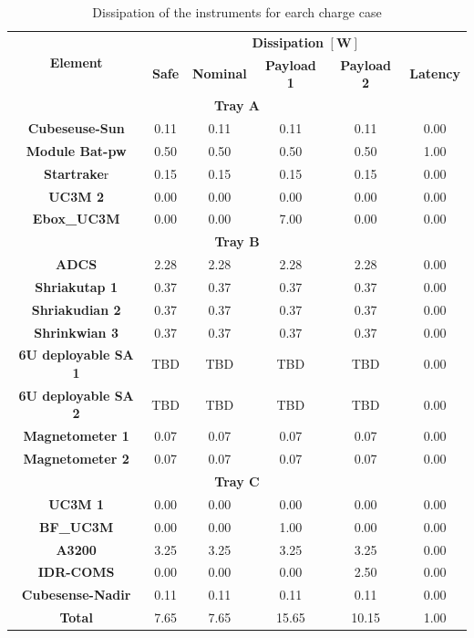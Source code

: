 \begin{table}[H]
    \centering
    \caption{Dissipation of the instruments for earch charge case}
    \label{tab:dissipationUPMSat3}
    
\begin{tabular}{cccccc}
    \toprule \multirow{2}{*}{ \textbf{Element }} & \multicolumn{5}{c}{ \textbf{Dissipation} $[\mathbf{W}]$} \\
    \cline{2-6} & \textbf{Safe} & \textbf{Nominal} & \textbf{Payload 1} & \textbf{Payload 2} &\textbf{ Latency} \\
    \hline \multicolumn{6}{c}{ \textbf{Tray A }} \\
    \hline \textbf{Cubeseuse-Sun} & 0.11 & 0.11 & 0.11 & 0.11 & 0.00 \\
     \textbf{Module Bat-pw} & 0.50 & 0.50 & 0.50 & 0.50 & 1.00 \\
     \textbf{Startrake}r & 0.15 & 0.15 & 0.15 & 0.15 & 0.00 \\
     \textbf{UC3M 2} & 0.00 & 0.00 & 0.00 & 0.00 & 0.00 \\
     \textbf{Ebox\_UC3M} & 0.00 & 0.00 & 7.00 & 0.00 & 0.00 \\
    \hline \multicolumn{6}{c}{ \textbf{Tray B }} \\
    \hline \textbf{ADCS} & 2.28 & 2.28 & 2.28 & 2.28 & 0.00 \\
     \textbf{Shriakutap 1} & 0.37 & 0.37 & 0.37 & 0.37 & 0.00 \\
     \textbf{Shriakudian 2} & 0.37 & 0.37 & 0.37 & 0.37 & 0.00 \\
     \textbf{Shrinkwian 3} & 0.37 & 0.37 & 0.37 & 0.37 & 0.00 \\
     \textbf{6U deployable SA 1} & TBD & TBD & TBD & TBD & 0.00 \\
     \textbf{6U deployable SA 2} & TBD & TBD & TBD & TBD & 0.00 \\
     \textbf{Magnetometer 1} & 0.07 & 0.07 & 0.07 & 0.07 & 0.00 \\
     \textbf{Magnetometer 2} & 0.07 & 0.07 & 0.07 & 0.07 & 0.00 \\
    \hline \multicolumn{6}{c}{ \textbf{Tray C} } \\
    \hline \textbf{UC3M 1} & 0.00 & 0.00 & 0.00 & 0.00 & 0.00 \\
     \textbf{BF\_UC3M} & 0.00 & 0.00 & 1.00 & 0.00 & 0.00 \\
    \textbf{ A3200 }& 3.25 & 3.25 & 3.25 & 3.25 & 0.00 \\
      \textbf{IDR-COMS} & 0.00 & 0.00 & 0.00 & 2.50 & 0.00 \\
    \textbf{ Cubesense-Nadir} & 0.11 & 0.11 & 0.11 & 0.11 & 0.00 \\
     \hline \textbf{Total} & 7.65 & 7.65 & 15.65 & 10.15 & 1.00 \\
     \bottomrule
    
    \end{tabular}
    \end{table}


